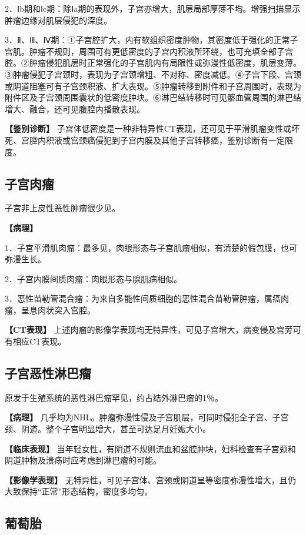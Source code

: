 2．Ⅰb期和Ⅰc期：除Ⅰa期的表现外，子宫亦增大，肌层局部厚薄不均。增强扫描显示肿瘤边缘对肌层侵犯的深度。

3．Ⅱ、Ⅲ、Ⅳ期：①子宫腔扩大，内有软组织密度肿物，其密度低于强化的正常子宫肌。肿瘤不规则，周围可有更低密度的子宫内积液所环绕，也可充填全部子宫腔。②肿瘤侵犯肌层时正常强化的子宫肌内有局限性或弥漫性低密度，肌层变薄。③肿瘤侵犯子宫颈时，表现为子宫颈增粗、不对称、密度减低。④子宫下段、宫颈或阴道阻塞可有子宫颈积液、扩大表现。⑤肿瘤转移到附件和子宫周围时，表现为附件区及子宫颈周围囊状的低密度肿块。⑥淋巴结转移时可见髂血管周围的淋巴结增大、融合，还可见腹腔内播散表现。

\textbf{【鉴别诊断】}
子宫体低密度是一种非特异性CT表现，还可见于平滑肌瘤变性或坏死、宫腔内积液或宫颈癌侵犯到子宫内膜及其他子宫转移癌，鉴别诊断有一定限度。

\subsection{子宫肉瘤}

子宫非上皮性恶性肿瘤很少见。

\textbf{【病理】}

1．子宫平滑肌肉瘤：最多见，肉眼形态与子宫肌瘤相似，有清楚的假包膜，也可弥漫生长。

2．子宫内膜间质肉瘤：肉眼形态与腺肌病相似。

3．恶性苗勒管混合瘤：为来自多能性间质细胞的恶性混合苗勒管肿瘤，属癌肉瘤，呈息肉状突入宫腔。

\textbf{【CT表现】}
上述肉瘤的影像学表现均无特异性，可见子宫增大，病变侵及宫旁可有相应CT表现。

\subsection{子宫恶性淋巴瘤}

原发于生殖系统的恶性淋巴瘤罕见，约占结外淋巴瘤的1％。

\textbf{【病理】}
几乎均为NHL。肿瘤弥漫性侵及子宫肌层，可同时侵犯全子宫、子宫颈、阴道。整个子宫明显增大，甚至可达足月妊娠大小。

\textbf{【临床表现】}
当年轻女性，有阴道不规则流血和盆腔肿块，妇科检查有子宫颈和阴道肿物及溃疡时应考虑到淋巴瘤的可能。

\textbf{【影像学表现】}
无特异性，可见子宫体、宫颈或阴道呈等密度弥漫性增大，且仍大致保持“正常”形态结构，密度多均匀。

\subsection{葡萄胎}

